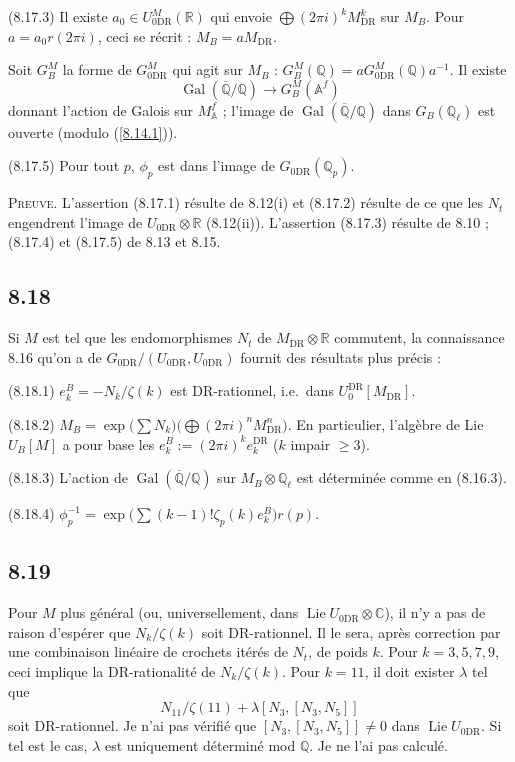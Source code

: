 \documentclass[12pt,a4paper]{article}
\theoremstyle{plain}
\theoremstyle{definition}
\theoremstyle{remark}
\DeclareMathOperator{\Lie}{Lie}
\DeclareMathOperator{\Gal}{Gal}
\newcommand{\Q}{\mathbb{Q}}
\newcommand{\C}{\mathbb{C}}
\newcommand{\R}{\mathbb{R}}
\newcommand{\Af}{\mathbb{A}^f}
\newcommand{\DR}{\mathrm{DR}}
\begin{document}
(8.17.3) Il existe $a_0 \in U_{0\DR}^M(\R)$ qui envoie $\bigoplus (2\pi i)^k M_{\DR}^k$ sur $M_B$. Pour $a = a_0 r(2\pi i)$, ceci se r\'ecrit : $M_B = a M_{\DR}$.

Soit $G_B^M$ la forme de $G_{0\DR}^M$ qui agit sur $M_B$ : $G_B^M(\Q) = a G_{0\DR}^M(\Q) a^{-1}$. Il existe
\begin{equation}\label{8.17.4}
\Gal(\overline{\Q}/\Q) \longrightarrow G_B^M(\Af) \tag{8.17.4}
\end{equation}
donnant l'action de Galois sur $M_\Af$ ; l'image de $\Gal(\overline{\Q}/\Q)$ dans $G_B(\Q_\ell)$ est ouverte (modulo (\ref{8.14.1})).

(8.17.5) Pour tout $p$, $\phi_p$ est dans l'image de $G_{0\DR}(\Q_p)$.

\textsc{Preuve.} L'assertion (8.17.1) r\'esulte de 8.12(i) et (8.17.2) r\'esulte de ce que les $N_t$ engendrent l'image de $U_{0\DR} \otimes \R$ (8.12(ii)). L'assertion (8.17.3) r\'esulte de 8.10 ; (8.17.4) et (8.17.5) de 8.13 et 8.15.

\subsection*{8.18}

Si $M$ est tel que les endomorphismes $N_t$ de $M_{\DR} \otimes \R$ commutent, la connaissance 8.16 qu'on a de $G_{0\DR}/(U_{0\DR}, U_{0\DR})$ fournit des r\'esultats plus pr\'ecis :

(8.18.1) $e_k^B = -N_k/\zeta(k)$ est DR-rationnel, i.e.~dans $U_0^\DR[M_\DR]$.

(8.18.2) $M_B = \exp\big(\sum N_k\big)\big(\bigoplus (2\pi i)^n M_{\DR}^n\big)$. En particulier, l'alg\`ebre de Lie $U_B[M]$ a pour base les $e_k^B := (2\pi i)^k e_k^\DR$ ($k$ impair $\geq 3$).

(8.18.3) L'action de $\Gal(\overline{\Q}/\Q)$ sur $M_B \otimes \Q_\ell$ est d\'etermin\'ee comme en (8.16.3).

(8.18.4) $\phi_p^{-1} = \exp\big(\sum (k-1)!\zeta_p(k) e_k^B\big) r(p)$.

\subsection*{8.19}

Pour $M$ plus g\'en\'eral (ou, universellement, dans $\Lie U_{0\DR} \otimes \C$), il n'y a pas de raison d'esp\'erer que $N_k/\zeta(k)$ soit DR-rationnel. Il le sera, apr\`es correction par une combinaison lin\'eaire de crochets it\'er\'es de $N_t$, de poids $k$. Pour $k = 3, 5, 7, 9$, ceci implique la DR-rationalit\'e de $N_k/\zeta(k)$. Pour $k = 11$, il doit exister $\lambda$ tel que
$$N_{11}/\zeta(11) + \lambda [N_3, [N_3, N_5]]$$
soit DR-rationnel. Je n'ai pas v\'erifi\'e que $[N_3, [N_3, N_5]] \neq 0$ dans $\Lie U_{0\DR}$. Si tel est le cas, $\lambda$ est uniquement d\'etermin\'e mod $\Q$. Je ne l'ai pas calcul\'e.
\end{document}
